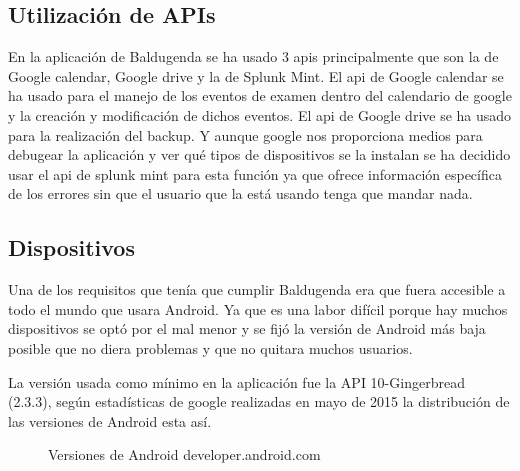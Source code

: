 \subsection{Utilización de APIs}
\label{subsecc:Utilización de APIs}

En la aplicación de Baldugenda se ha usado 3 apis principalmente que son la de Google calendar, Google drive y la de Splunk Mint.
El api de Google calendar se ha usado para el manejo de los eventos de examen dentro del calendario de google y la creación y modificación de dichos eventos.
El api de Google drive se ha usado para la realización del backup.
Y aunque google nos proporciona medios para debugear la aplicación y ver qué tipos de dispositivos se la instalan se ha decidido usar el api de splunk mint para esta función ya que ofrece información específica de los errores sin que el usuario que la está usando tenga que mandar nada.

\subsection{Dispositivos}
\label{subsecc:Dispositivos}

Una de los requisitos que tenía que cumplir Baldugenda era que fuera accesible a todo el mundo que usara Android. Ya que es una labor difícil porque hay muchos dispositivos se optó por el mal menor y se fijó la versión de Android más baja posible que no diera problemas y que no quitara muchos usuarios.

La versión usada como mínimo en la aplicación fue la API 10-Gingerbread (2.3.3), según estadísticas de google realizadas en mayo de 2015 la distribución de las versiones de Android esta así.

\begin{figure}[H] 
  \begin{center} 
    \caption{Versiones de Android developer.android.com} 
    \label{fig:VersionesAndroid} 
  \end{center} 
\end{figure}

